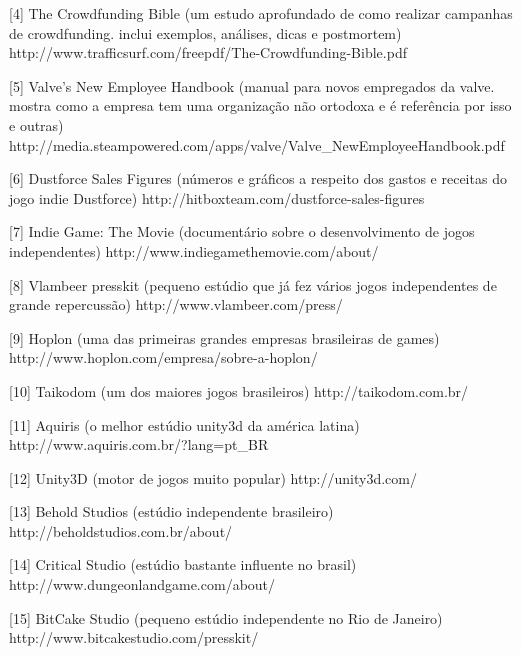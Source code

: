 [4] The Crowdfunding Bible
(um estudo aprofundado de como realizar campanhas de crowdfunding. inclui exemplos, análises, dicas e postmortem)
http://www.trafficsurf.com/freepdf/The-Crowdfunding-Bible.pdf

[5] Valve's New Employee Handbook
(manual para novos empregados da valve. mostra como a empresa tem uma organização não ortodoxa e é referência por isso e outras)
http://media.steampowered.com/apps/valve/Valve_NewEmployeeHandbook.pdf

[6] Dustforce Sales Figures
(números e gráficos a respeito dos gastos e receitas do jogo indie Dustforce)
http://hitboxteam.com/dustforce-sales-figures

[7] Indie Game: The Movie
(documentário sobre o desenvolvimento de jogos independentes)
http://www.indiegamethemovie.com/about/

[8] Vlambeer presskit
(pequeno estúdio que já fez vários jogos independentes de grande repercussão)
http://www.vlambeer.com/press/

[9] Hoplon
(uma das primeiras grandes empresas brasileiras de games)
http://www.hoplon.com/empresa/sobre-a-hoplon/

[10] Taikodom
(um dos maiores jogos brasileiros)
http://taikodom.com.br/

[11] Aquiris
(o melhor estúdio unity3d da américa latina)
http://www.aquiris.com.br/?lang=pt_BR

[12] Unity3D
(motor de jogos muito popular)
http://unity3d.com/

[13] Behold Studios
(estúdio independente brasileiro)
http://beholdstudios.com.br/about/

[14] Critical Studio
(estúdio bastante influente no brasil)
http://www.dungeonlandgame.com/about/

[15] BitCake Studio
(pequeno estúdio independente no Rio de Janeiro)
http://www.bitcakestudio.com/presskit/
